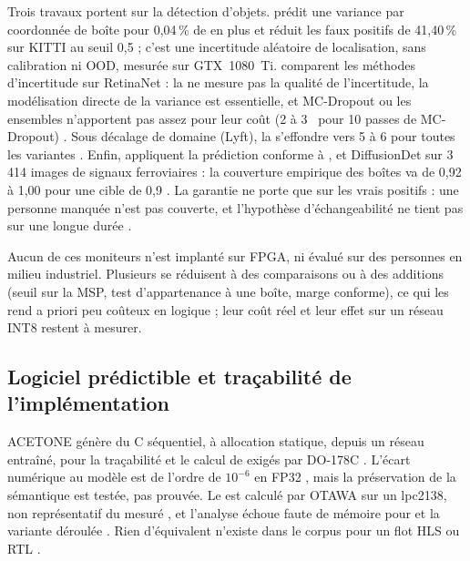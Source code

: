 Trois travaux portent sur la détection d'objets. 
\citep{arxiv-1904.04620-gaussian-yolov3-accurate-fast-object}\pp{} prédit une variance par
coordonnée de boîte pour 0,04\,\% de  en plus  et réduit les faux positifs
de 41,40\,\% sur KITTI au seuil 0,5  ; c'est une incertitude aléatoire de
localisation, sans calibration ni OOD, mesurée sur GTX~1080~Ti.
\citet{arxiv-2011.10671-review-comparative-probabilistic-object-detection} comparent les
méthodes d'incertitude sur RetinaNet : la  ne mesure pas la qualité de l'incertitude, la
modélisation directe de la variance est essentielle, et MC-Dropout ou les ensembles
n'apportent pas assez pour leur coût (2 à 3~ pour 10 passes de MC-Dropout) . Sous décalage de domaine (Lyft), la  s'effondre vers 5 à 6 pour toutes les
variantes . Enfin,
\citet{arxiv-2304.06052-confident-object-detection-conformal-prediction}\pp{} appliquent la
prédiction conforme à ,  et DiffusionDet sur 3\,414 images de signaux
ferroviaires : la couverture empirique des boîtes va de 0,92 à 1,00 pour une cible de 0,9
. La garantie ne porte que sur les vrais positifs  : une personne
manquée n'est pas couverte, et l'hypothèse d'échangeabilité ne tient pas sur une longue
durée .

Aucun de ces moniteurs n'est implanté sur FPGA, ni évalué sur des personnes en milieu
industriel. Plusieurs se réduisent à des comparaisons ou à des additions (seuil sur la MSP,
test d'appartenance à une boîte, marge conforme), ce qui les rend a priori peu coûteux en
logique \deduit ; leur coût réel et leur effet sur un réseau INT8 restent à mesurer.

\subsection{Logiciel prédictible et traçabilité de l'implémentation}

ACETONE \citep{2022-de-albuquerque-silva-acetone-predictable-programming-framework-ml}
génère du C séquentiel, à allocation statique, depuis un réseau entraîné, pour la
traçabilité et le calcul de  exigés par DO-178C . L'écart numérique au
modèle est de l'ordre de $10^{-6}$ en FP32 , mais la préservation de la sémantique
est testée, pas prouvée. Le  est calculé par OTAWA sur un lpc2138, non représentatif du
 mesuré , et l'analyse échoue faute de mémoire pour  et la
variante déroulée . Rien d'équivalent n'existe dans le corpus pour un flot HLS ou
RTL \deduit.

